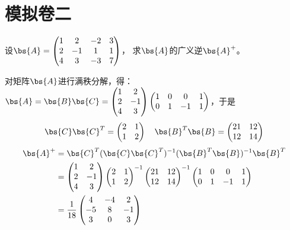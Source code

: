 \documentclass[12pt, a4paper, oneside, UTF8]{ctexbook}
\begin{document}
\else
\fi

\chapter{模拟卷二}
\begin{question} 
   设$\bs{A}=\begin{pmatrix}
    1&2&-2&3\\
    2&-1&1&1\\
    4&3&-3&7
   \end{pmatrix}$，
   求$\bs{A}$的广义逆$\bs{A}^+$。
\end{question}

\begin{solution}
    对矩阵$\bs{A}$进行满秩分解，得：
    $\bs{A}=\bs{B}\bs{C}=\begin{pmatrix}
        1 & 2\\
        2&-1\\
        4&3
    \end{pmatrix}\begin{pmatrix}
        1&0&0&1\\
        0&1&-1&1
    \end{pmatrix}$，于是
    \begin{align*}
        \bs{C}\bs{C}^T=\begin{pmatrix}
            2&1\\
            1&2
        \end{pmatrix} \quad \bs{B}^T\bs{B}=\begin{pmatrix}
            21&12\\
            12&14
        \end{pmatrix}
    \end{align*}
    \begin{align*}
        \bs{A}^+&=
    \bs{C}^T(\bs{C}\bs{C}^T)^{-1}(\bs{B}^T\bs{B})^{-1}\bs{B}^T\\
    &=\begin{pmatrix}
        1 & 2\\
        2&-1\\
        4&3
    \end{pmatrix}\begin{pmatrix}
        2&1\\
        1&2
    \end{pmatrix}^{-1}\begin{pmatrix}
        21&12\\
        12&14
    \end{pmatrix}^{-1}
    \begin{pmatrix}
        1&0&0&1\\
        0&1&-1&1
    \end{pmatrix}\\
    &=\frac{1}{18}\begin{pmatrix}
       4&-4&2\\
       -5&8&-1\\
       3&0&3 
    \end{pmatrix}
    \end{align*}
\end{solution}
\end{document}
